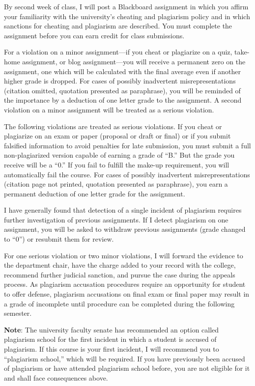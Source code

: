 \documentclass[]{article}
\begin{document}
By second week of class, I will post a Blackboard assignment in which
you affirm your familiarity with the university's cheating and
plagiarism policy and in which sanctions for cheating and plagiarism are
described. You must complete the assignment before you can earn credit
for class submissions.

For a violation on a minor assignment---if you cheat or plagiarize on a
quiz, take-home assignment, or blog assignment---you will receive a
permanent zero on the assignment, one which will be calculated with the
final average even if another higher grade is dropped. For cases of
possibly inadvertent misrepresentations (citation omitted, quotation
presented as paraphrase), you will be reminded of the importance by a
deduction of one letter grade to the assignment. A second violation on a
minor assignment will be treated as a serious violation.

The following violations are treated as serious violations. If you cheat
or plagiarize on an exam or paper (proposal or draft or final) or if you
submit falsified information to avoid penalties for late submission, you
must submit a full non-plagiarized version capable of earning a grade of
``B.'' But the grade you receive will be a ``0.'' If you fail to fulfill
the make-up requirement, you will automatically fail the course. For
cases of possibly inadvertent misrepresentations (citation page not
printed, quotation presented as paraphrase), you earn a permanent
deduction of one letter grade for the assignment.

I have generally found that detection of a single incident of plagiarism
requires further investigation of previous assignments. If I detect
plagiarism on one assignment, you will be asked to withdraw previous
assignments (grade changed to ``0'') or resubmit them for review.

For one serious violation or two minor violations, I will forward the
evidence to the department chair, have the charge added to your record
with the college, recommend further judicial sanction, and pursue the
case during the appeals process. As plagiarism accusation procedures
require an opportunity for student to offer defense, plagiarism
accusations on final exam or final paper may result in a grade of
incomplete until procedure can be completed during the following
semester.

\textbf{Note}: The university faculty senate has recommended an option
called plagiarism school for the first incident in which a student is
accused of plagiarism. If this course is your first incident, I will
recommend you to ``plagiarism school,'' which will be required. If you
have previously been accused of plagiarism or have attended plagiarism
school before, you are not eligible for it and shall face consequences
above.
\end{document}
